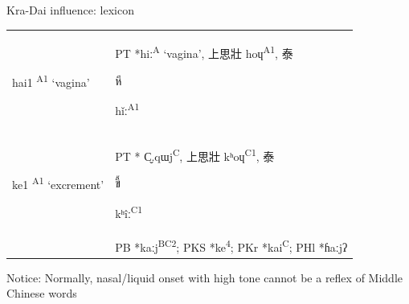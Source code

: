 \documentclass{beamer}
\begin{document}
\begin{frame}[fragile]{Kra-Dai influence: lexicon}
{\begin{tabular}{l|l}
     hai1 \textsuperscript{A1} \enquote*{vagina} & PT 
     *hiː\textsuperscript{A} \enquote*{vagina}, 上思壯 hoɥ\textsuperscript{A1}, 泰 \begin{thai}หี\end{thai} hǐː\textsuperscript{A1}\\
     ke1 \textsuperscript{A1} \enquote*{excrement} & PT * C̬.qɯj\textsuperscript{C}, 上思壯 kʰoɥ\textsuperscript{C1}, 泰 \begin{thai}ขี้\end{thai} kʰîː\textsuperscript{C1}\\
      & PB *kaːj\textsuperscript{BC2}; PKS *ke\textsuperscript{4}; PKr *kai\textsuperscript{C}; PHl *ɦaːjʔ\\
\end{tabular}}
\medskip

{\footnotesize Notice: Normally, nasal/liquid onset with high tone cannot be a reflex of Middle Chinese words}

\end{frame}
\end{document}

